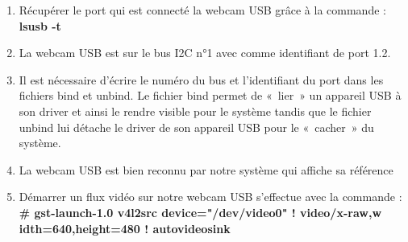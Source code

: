 \begin{enumerate}
  \item Récupérer le port qui est connecté la webcam USB grâce à la commande :
  \textbf{lsusb -t}

\item La webcam USB est sur le bus I2C n°1 avec comme identifiant de port 1.2.

\item Il est nécessaire d'écrire le numéro du bus et l’identifiant du port dans les fichiers bind
et unbind. Le fichier bind permet de  « lier » un appareil USB à son driver et
ainsi le rendre visible pour le système tandis que le fichier unbind lui détache
le driver de son appareil USB pour le « cacher » du système.

\item La webcam USB est bien reconnu par notre système qui affiche sa
référence %

\item Démarrer un flux vidéo sur notre webcam USB s'effectue avec la commande :
\textbf{\# gst-launch-1.0 v4l2src device="/dev/video0" ! video/x-raw,w
idth=640,height=480 ! autovideosink}



\end{enumerate}

